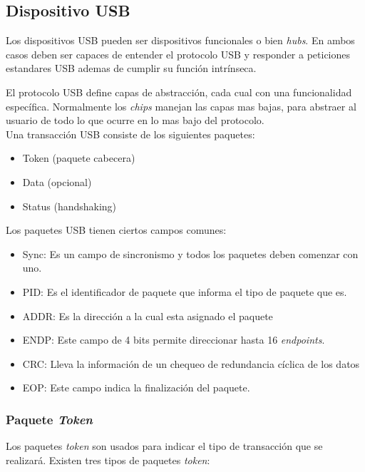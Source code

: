 \subsection{Dispositivo USB}

Los dispositivos USB pueden ser dispositivos funcionales o bien \emph{hubs}.
En ambos casos deben ser capaces de entender el protocolo USB y responder a
peticiones estandares USB ademas de cumplir su funci\'on intr\'inseca. 



El protocolo USB define capas de abstracci\'on, cada cual con una funcionalidad
espec\'ifica. Normalmente los \emph{chips} manejan las capas mas bajas, para
abstraer al usuario de todo lo que ocurre en lo mas bajo del protocolo.\\

Una transacci\'on USB consiste de los siguientes paquetes:
\begin{itemize}
 \item Token (paquete cabecera)
 \item Data (opcional)
 \item Status (handshaking)
\end{itemize}

Los paquetes USB tienen ciertos campos comunes: 
\begin{itemize}
 \item Sync: Es un campo de sincronismo y todos los paquetes deben comenzar
con uno.
 \item PID: Es el identificador de paquete que informa el tipo de paquete que
es.
 \item ADDR: Es la direcci\'on a la cual esta asignado el paquete
 \item ENDP: Este campo de 4 bits permite direccionar hasta 16
\emph{endpoints}.
 \item CRC: Lleva la informaci\'on de un chequeo de redundancia c\'iclica de
los datos
 \item EOP: Este campo indica la finalizaci\'on del paquete.
\end{itemize}

\subsubsection{Paquete \emph{Token}}
Los paquetes \emph{token} son usados para indicar el tipo de transacci\'on que
se realizar\'a. Existen tres tipos de paquetes \emph{token}:


